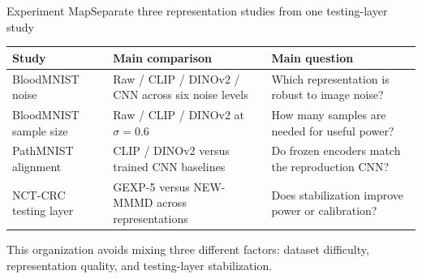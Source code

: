 \documentclass[aspectratio=169,10pt]{beamer}
\newcommand{\smallnote}[1]{%
  {\scriptsize\color{mutedgray}#1}
}
\begin{document}
\begin{frame}{Experiment Map}{Separate three representation studies from one testing-layer study}
\begin{center}
\end{center}

\vspace{0.18cm}
\scriptsize
\begin{tabularx}{0.96\linewidth}{lXX}
\toprule
Study & Main comparison & Main question \\
\midrule
BloodMNIST noise & Raw / CLIP / DINOv2 / CNN across six noise levels & Which representation is robust to image noise? \\
BloodMNIST sample size & Raw / CLIP / DINOv2 at $\sigma=0.6$ & How many samples are needed for useful power? \\
PathMNIST alignment & CLIP / DINOv2 versus trained CNN baselines & Do frozen encoders match the reproduction CNN? \\
NCT-CRC testing layer & GEXP-5 versus NEW-MMMD across representations & Does stabilization improve power or calibration? \\
\bottomrule
\end{tabularx}
\vspace{0.12cm}
\begin{center}
\smallnote{This organization avoids mixing three different factors: dataset difficulty, representation quality, and testing-layer stabilization.}
\end{center}
\end{frame}
\end{document}
